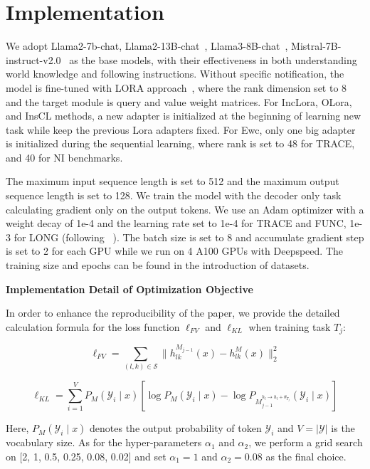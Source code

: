 


\section{Implementation}
\label{app:implement}
We adopt Llama2-7b-chat, Llama2-13B-chat~\citep{touvron2023llama}, Llama3-8B-chat~\citep{dubey2024llama}, Mistral-7B-instruct-v2.0~\citep{jiang2023mistral} as the base models, with their effectiveness in both understanding world knowledge and following instructions. Without specific notification, the model is fine-tuned with LORA approach~\cite{hu2021lora}, where the rank dimension set to 8 and the target module is query and value weight matrices. For IncLora, OLora, and InsCL methods, a new adapter is initialized at the beginning of learning new task while keep the previous Lora adapters fixed. For Ewc, only one big adapter is initialized during the sequential learning, where rank is set to 48 for TRACE, and 40 for NI benchmarks.

The maximum input sequence length is set to 512 and the maximum output sequence length is set to 128. We train the model with the decoder only task calculating gradient only on the output tokens. We use an Adam optimizer with a weight decay of 1e-4 and the learning rate set to 1e-4 for TRACE and FUNC, 1e-3 for LONG (following ~\cite{wang2023trace}). The batch size is set to 8 and accumulate gradient step is set to 2 for each GPU while we run on 4 A100 GPUs with Deepspeed. The training size and epochs can be found in the introduction of datasets. 

\textbf{Implementation Detail of Optimization Objective}



In order to enhance the reproducibility of the paper, we provide the detailed calculation formula for the loss function $\ell_{FV}$ and
$\ell_{KL}$ when training task $T_j$: 

\begin{equation}
\ell_{FV} = \sum_{(l,k) \in \mathcal{S}} \| h_{lk}^{M_{j-1}}(x)-h^M_{lk}(x)\|_2^2
\end{equation}

\begin{equation}
\ell_{KL} = \sum_{i=1}^V P_M(\mathcal{Y}_i \mid x)[\log P_M(\mathcal{Y}_i \mid x) - \log P_{M_{j-1}^{{h_{l}\rightarrow h_{l}+\theta_{T_j}}}}(\mathcal{Y}_i \mid x)]
\end{equation}


Here, $P_M(\mathcal{Y}_i \mid x)$ denotes the output probability of token $\mathcal{Y}_i$ and $V = |\mathcal{Y}|$ is the vocabulary size.
As for the hyper-parameters $\alpha_1$ and  $\alpha_2$, we perform a grid search on  [2, 1, 0.5, 0.25, 0.08, 0.02] and set  $\alpha_1 = 1$ and $\alpha_2 = 0.08 $ as the final choice. 

